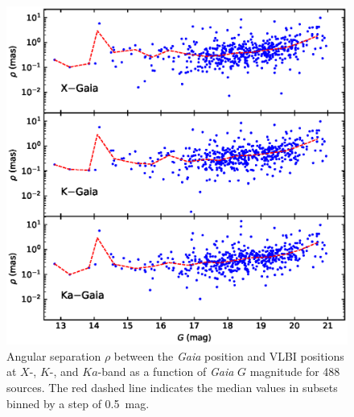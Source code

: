 \documentclass{aa-note}   %
\begin{document}
\begin{figure}[hbtp]
    \centering
    \includegraphics[width=\columnwidth]{figs/rho-g-mag}
    \caption[]{\label{fig:rho-g-mag}
        Angular separation $\rho$ between the {\it Gaia} position and VLBI positions at $X$-, $K$-, and $Ka$-band as a function of \textit{Gaia} $G$ magnitude for 488 sources.
        The red dashed line indicates the median values in subsets binned by a step of 0.5~mag.
    }
\end{figure}
\end{document}
